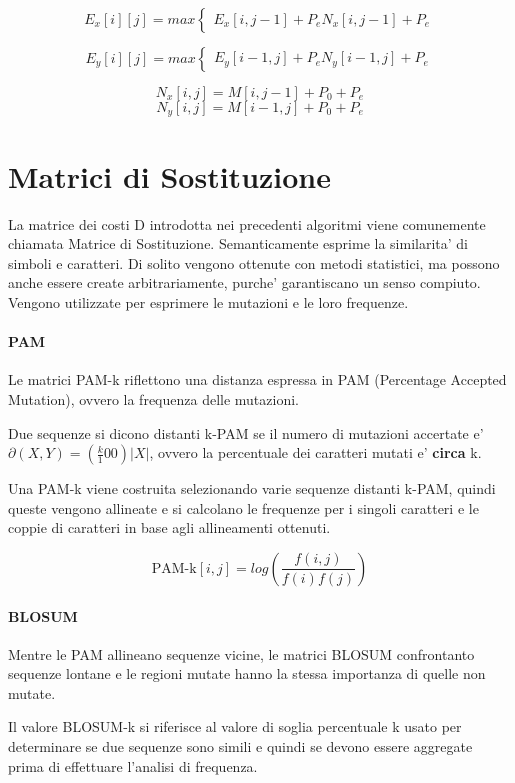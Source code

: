 \[
E_x[i][j] = max
\begin{cases}
  E_x[i,j-1] + P_e
  N_x[i,j-1] + P_e
\end{cases}
\]

\[
E_y[i][j] = max
\begin{cases}
  E_y[i-1,j] + P_e
  N_y[i-1,j] + P_e
\end{cases}
\]

\[ N_x[i,j] = M[i,j-1] + P_0 + P_e \]
\[ N_y[i,j] = M[i-1,j] + P_0 + P_e \]

\section{Matrici di Sostituzione}

La matrice dei costi D introdotta nei precedenti algoritmi viene comunemente chiamata Matrice di Sostituzione. Semanticamente esprime la similarita' di simboli e caratteri. Di solito vengono ottenute con metodi statistici, ma possono anche essere create arbitrariamente, purche' garantiscano un senso compiuto. Vengono utilizzate per esprimere le mutazioni e le loro frequenze.

\paragraph{PAM}

Le matrici PAM-k riflettono una distanza espressa in PAM (Percentage Accepted Mutation), ovvero la frequenza delle mutazioni.

Due sequenze si dicono distanti k-PAM se il numero di mutazioni accertate e' $\partial(X, Y) = (\frac k 100)|X|$, ovvero la percentuale dei caratteri mutati e' \textbf{circa} k.

Una PAM-k viene costruita selezionando varie sequenze distanti k-PAM, quindi queste vengono allineate e si calcolano le frequenze per i singoli caratteri e le coppie di caratteri in base agli allineamenti ottenuti.

\[
    \text{PAM-k}[i,j] = log (\frac {f(i,j)} {f(i)f(j)})
\]

\paragraph{BLOSUM}

Mentre le PAM allineano sequenze vicine, le matrici BLOSUM confrontanto sequenze lontane e le regioni mutate hanno la stessa importanza di quelle non mutate.

Il valore BLOSUM-k si riferisce al valore di soglia percentuale k usato per determinare se due sequenze sono simili e quindi se devono essere aggregate prima di effettuare l'analisi di frequenza.

